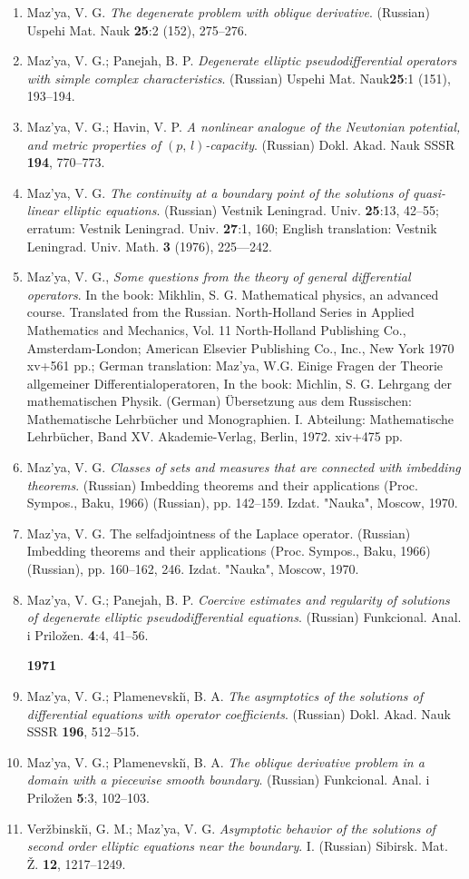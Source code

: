 \documentclass{article}
\begin{document}
\begin{enumerate}
{\bf 1970}
\item Maz'ya, V. G. {\it The degenerate problem with oblique
derivative}.
(Russian) Uspehi Mat.
Nauk {\bf 25}:2 (152), 275--276.
\item Maz'ya, V. G.; Panejah, B. P. {\it Degenerate elliptic
pseudodifferential operators with simple complex
characteristics}. (Russian) Uspehi Mat. Nauk{\bf 25}:1 (151),
193--194.
\item Maz'ya, V. G.; Havin, V. P. {\it A nonlinear analogue of the
Newtonian potential, and metric
properties of $(p,\,l)$-capacity}. (Russian) Dokl. Akad. Nauk SSSR
{\bf
194}, 770--773.
\item Maz'ya, V. G. {\it The continuity at a boundary point of the
solutions of quasi-linear elliptic equations}.
(Russian) Vestnik Leningrad. Univ. {\bf 25}:13, 42--55; erratum:
Vestnik
Leningrad. Univ. {\bf 27}:1, 160; English
translation: Vestnik Leningrad. Univ. Math. {\bf 3} (1976), 225---242.
\item Maz'ya, V. G., {\it Some questions from the theory of general
differential operators}. In the book: Mikhlin, S. G.
Mathematical physics, an advanced course.  Translated from the
Russian.
North-Holland Series in Applied Mathematics and Mechanics, Vol. 11
North-Holland Publishing Co., Amsterdam-London; American
Elsevier Publishing Co., Inc., New York 1970 xv+561 pp.; German
translation: Maz'ya, W.G. Einige Fragen der Theorie
allgemeiner Differentialoperatoren, In the book: Michlin, S. G.
Lehrgang
der mathematischen Physik. (German)  \"Ubersetzung aus dem
Russischen: Mathematische
Lehrb\"ucher und Monographien. I. Abteilung: Mathematische
Lehrb\"ucher,
Band XV. Akademie-Verlag, Berlin, 1972. xiv+475
pp.
\item Maz'ya, V. G. {\it Classes of sets and measures that are
connected
with imbedding theorems}.
(Russian) Imbedding theorems and their applications (Proc. Sympos.,
Baku,
1966) (Russian), pp. 142--159. Izdat. "Nauka",
Moscow, 1970.
\item Maz'ya, V. G. The selfadjointness of the Laplace operator.
(Russian)
Imbedding theorems and
their applications (Proc. Sympos., Baku, 1966) (Russian), pp.
160--162,
246. Izdat. "Nauka", Moscow, 1970.
\item Maz'ya, V. G.; Panejah, B. P. {\it Coercive estimates and
regularity
of solutions of degenerate elliptic
pseudodifferential equations}. (Russian) Funkcional. Anal. i Prilo\v
zen.
{\bf 4}:4, 41--56.
\hfill\break

{\bf 1971}
\item Maz'ya, V. G.; Plamenevski{\u\i}, B. A. {\it The asymptotics of
the
solutions of differential equations with
operator coefficients}. (Russian) Dokl. Akad. Nauk SSSR {\bf 196},
512--515.
\item Maz'ya, V. G.; Plamenevski{\u\i}, B. A. {\it The oblique
derivative
problem in a domain with a piecewise
smooth boundary}. (Russian) Funkcional. Anal. i Prilo\v zen {\bf 5}:3,
102--103.
\item Ver\v zbinski{\u\i}, G. M.; Maz'ya, V. G. {\it Asymptotic
behavior of
the solutions of second order elliptic
equations near the boundary}. I. (Russian) Sibirsk. Mat. \v Z. {\bf
12},
1217--1249.\hfill\break


\end{enumerate}
\end{document}
